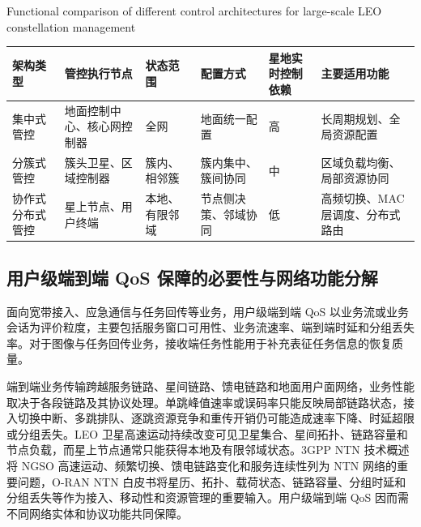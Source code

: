 \begin{table}[!htp]
\centering
\footnotesize

{Functional comparison of different control architectures for large-scale LEO constellation management}
\label{tab:control-arch-compare}
\setlength{\tabcolsep}{3.2pt}
\renewcommand{\arraystretch}{1.18}
\begin{tabular}{p{} p{} p{} p{} p{} p{}}
\toprule
架构类型
& 管控执行节点
& 状态范围
& 配置方式
& 星地实时控制依赖
& 主要适用功能 \\
\midrule

集中式管控
& 地面控制中心、核心网控制器
& 全网
& 地面统一配置
& 高
& 长周期规划、全局资源配置 \\

\midrule

分簇式管控
& 簇头卫星、区域控制器
& 簇内、相邻簇
& 簇内集中、簇间协同
& 中
& 区域负载均衡、局部资源协同 \\

\midrule

协作式分布式管控
& 星上节点、用户终端
& 本地、有限邻域
& 节点侧决策、邻域协同
& 低
& 高频切换、MAC 层调度、分布式路由 \\

\bottomrule
\end{tabular}
\end{table}

\subsection{用户级端到端 QoS 保障的必要性与网络功能分解}

面向宽带接入、应急通信与任务回传等业务，用户级端到端 QoS 以业务流或业务会话为评价粒度，主要包括服务窗口可用性、业务流速率、端到端时延和分组丢失率。对于图像与任务回传业务，接收端任务性能用于补充表征任务信息的恢复质量。

端到端业务传输跨越服务链路、星间链路、馈电链路和地面用户面网络，业务性能取决于各段链路及其协议处理。单跳峰值速率或误码率只能反映局部链路状态，接入切换中断、多跳排队、逐跳资源竞争和重传开销仍可能造成速率下降、时延超限或分组丢失。LEO 卫星高速运动持续改变可见卫星集合、星间拓扑、链路容量和节点负载，而星上节点通常只能获得本地及有限邻域状态。3GPP NTN 技术概述将 NGSO 高速运动、频繁切换、馈电链路变化和服务连续性列为 NTN 网络的重要问题，O-RAN NTN 白皮书将星历、拓扑、载荷状态、链路容量、分组时延和分组丢失等作为接入、移动性和资源管理的重要输入\cite{3gpp-NTNOverview-2025,oran_ntn_deployments_2025}。用户级端到端 QoS 因而需不同网络实体和协议功能共同保障。

